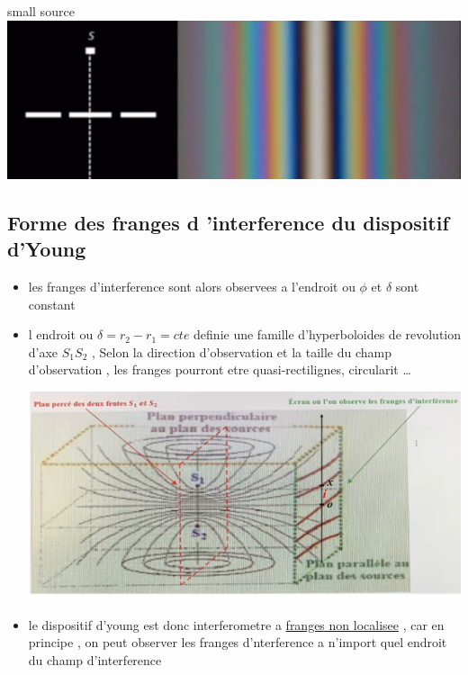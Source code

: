 \documentclass[12pt]{book}
\begin{document}
                    \begin{minipage}{0.54\linewidth}
                        small source\\
                        \includegraphics[width=\linewidth]{pic/ssize2.png}
                    \end{minipage}
            \subsection{Forme des franges d 'interference du dispositif d'Young}
                \begin{itemize}
                    \item les franges d'interference sont alors observees a l'endroit ou $\phi$ et $\delta$ sont constant 
                    \item 
                        \begin{minipage}{0.49\linewidth}
                            l endroit ou $\delta=r_2-r_1=cte$ definie une famille d'hyperboloides de revolution d'axe $S_1 S_2$ , Selon la direction d'observation et la taille du champ d'observation ,
                        les  franges pourront etre quasi-rectilignes, circularit \ldots
                        \end{minipage}
                        \begin{minipage}{0.49\linewidth}
                            \includegraphics[width=\linewidth]{pic/hyperyoung1.png}
                        \end{minipage}
                    \item le dispositif d'young est donc interferometre a \underline{franges non localisee} , car en principe , on peut observer les franges d'nterference a n'import quel endroit du champ d'interference
                \end{itemize}
                \pagebreak
\end{document}
